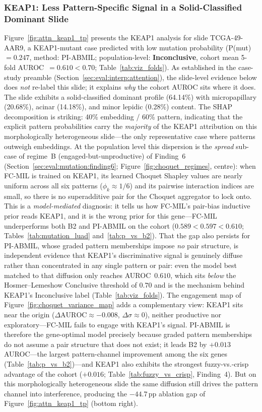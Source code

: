 \subsubsection{KEAP1: Less Pattern-Specific Signal in a Solid-Classified Dominant Slide}
\label{sec:eval:tcga:keap1}

Figure~\ref{fig:attn_keap1_tp} presents the KEAP1 analysis for slide
TCGA-49-AAR9, a KEAP1-mutant case predicted with low mutation
probability (P(mut)~$= 0.247$, method: PI-ABMIL;
population-level: \textbf{Inconclusive}, cohort mean 5-fold
AUROC~$= 0.610 < 0.70$; Table~\ref{tab:viz_folds}).
As established in the case-study preamble
(Section~\ref{sec:eval:interp:attention}), the slide-level
evidence below does \emph{not} re-label this slide; it explains
\emph{why} the cohort AUROC sits where it does.
The slide exhibits a solid-classified dominant profile (64.14\%) with
micropapillary (20.68\%), acinar (14.18\%), and minor lepidic (0.28\%) content.
The SHAP decomposition is striking: 40\% embedding / 60\% pattern,
indicating that the explicit pattern probabilities carry the
\emph{majority} of the KEAP1 attribution on this morphologically
heterogeneous slide---the only representative case where patterns
outweigh embeddings.
At the population level this dispersion is the \emph{spread}
sub-case of regime~B (engaged-but-unproductive) of Finding~6
(Section~\ref{sec:eval:mutation:finding6};
Figure~\ref{fig:choquet_regimes}, centre): when FC-MIL is
trained on KEAP1, its learned Choquet Shapley values are nearly
uniform across all six patterns ($\phi_k \approx 1/6$) and its
pairwise interaction indices are small, so there is no
superadditive pair for the Choquet aggregator to lock onto.
This is a \emph{model-mediated} diagnosis: it tells us how
FC-MIL's pair-bias inductive prior reads KEAP1, and it is the
wrong prior for this gene---FC-MIL underperforms both B2 and
PI-ABMIL on the cohort
($0.589 < 0.597 < 0.610$; Tables~\ref{tab:mutation_luad}
and~\ref{tab:p_vs_b2}).
That the gap also persists for PI-ABMIL, whose graded pattern
memberships impose \emph{no} pair structure, is independent
evidence that KEAP1's discriminative signal is genuinely
diffuse rather than concentrated in any single pattern or
pair: even the model best matched to that diffusion only
reaches AUROC~$0.610$, which sits \emph{below} the
Hosmer--Lemeshow Conclusive threshold of $0.70$ and is the
mechanism behind KEAP1's Inconclusive label
(Table~\ref{tab:viz_folds}).
The engagement map of Figure~\ref{fig:choquet_variance_map}
adds a complementary view: KEAP1 sits near the origin
($\Delta\mathrm{AUROC} \approx -0.008$,
$\Delta\sigma \approx 0$), neither productive nor
exploratory---FC-MIL fails to engage with KEAP1's signal.
PI-ABMIL is therefore the gene-optimal model precisely because
graded pattern memberships do not assume a pair structure that
does not exist; it leads B2 by $+0.013$ AUROC---the largest
pattern-channel improvement among the six genes
(Table~\ref{tab:p_vs_b2})---and KEAP1 also exhibits the
strongest fuzzy-vs.-crisp advantage of the cohort ($+0.016$;
Table~\ref{tab:fuzzy_vs_crisp}, Finding~4).
But on this morphologically heterogeneous slide the same
diffusion still drives the pattern channel into interference,
producing the $-44.7$\,pp ablation gap of
Figure~\ref{fig:attn_keap1_tp} (bottom right).

